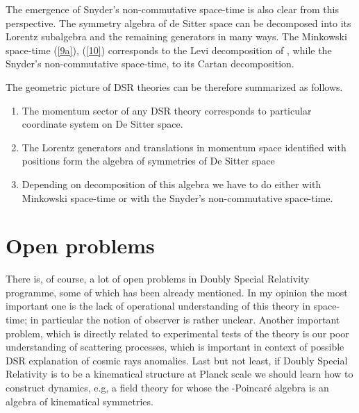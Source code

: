 \documentclass[a4paper,a4paper]{article}
\begin{document}
The emergence of Snyder's non-commutative space-time is also clear from this perspective. The symmetry algebra \coordHE{} of de Sitter space can be decomposed into its \coordHE{} Lorentz subalgebra and the remaining generators in many ways. The \myHighlight{$\kappa$}\coordHE{} Minkowski space-time (\ref{9a}), (\ref{10}) corresponds to the Levi decomposition of \coordHE{}, while the Snyder's non-commutative space-time, to its Cartan decomposition.

The geometric picture of DSR theories can be therefore summarized as follows. 
\begin{enumerate}
\item The momentum sector of any DSR theory corresponds to particular coordinate system on De Sitter space.
\item The Lorentz generators and translations in momentum space identified with positions form the \coordHE{} algebra of symmetries of De Sitter space
\item Depending on decomposition of this \coordHE{} algebra we have to do either with \myHighlight{$\kappa$}\coordHE{} Minkowski space-time or with the Snyder's non-commutative space-time.
\end{enumerate}

\section{Open problems}

There is, of course, a lot of open problems in Doubly Special Relativity programme, some of which has been already mentioned. In my opinion the most important one is the lack of operational understanding of this theory in space-time; in particular the notion of observer is rather unclear. Another important problem, which is directly related to experimental tests of the theory is our poor understanding of scattering processes, which is important in context of possible DSR explanation of cosmic rays anomalies. Last but not least, if Doubly Special Relativity is to be a kinematical structure at Planck scale we should learn how to construct dynamics, e.g, a field theory for whose the \myHighlight{$\kappa$}\coordHE{}-Poincar\'e algebra is an algebra of kinematical symmetries. 
\end{document}
